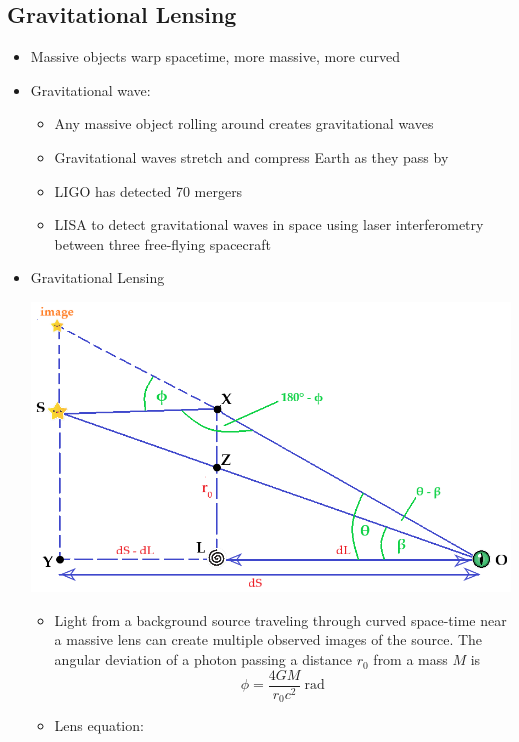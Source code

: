 \documentclass{book}
\begin{document}
\subsection{Gravitational Lensing}
\begin{itemize}
    \item Massive objects warp spacetime, more massive, more curved
    \item Gravitational wave:
          \begin{itemize}
              \item Any massive object rolling around creates gravitational waves
              \item Gravitational waves stretch and compress Earth as they pass by
              \item LIGO has detected 70 mergers
              \item LISA to detect gravitational waves in space using laser interferometry between three free-flying spacecraft
          \end{itemize}
    \item Gravitational Lensing
          \begin{center}
              \includegraphics[height = 0.4 \textwidth]{images/lensing.png}
          \end{center}
          \begin{itemize}
              \item Light from a background source traveling through curved space-time near a massive lens can create multiple observed images of the source. The angular deviation of a photon passing a distance $r_0$ from a mass $M$ is
                    \begin{equation*}
                        \phi = \frac{4 G M}{r_0 c^2}\ \text{rad} \tag{C\&O 28.20}
                    \end{equation*}
              \item Lens equation:
                    \begin{equation*}

\end{equation*}
\end{itemize}
\end{itemize}
\end{document}
